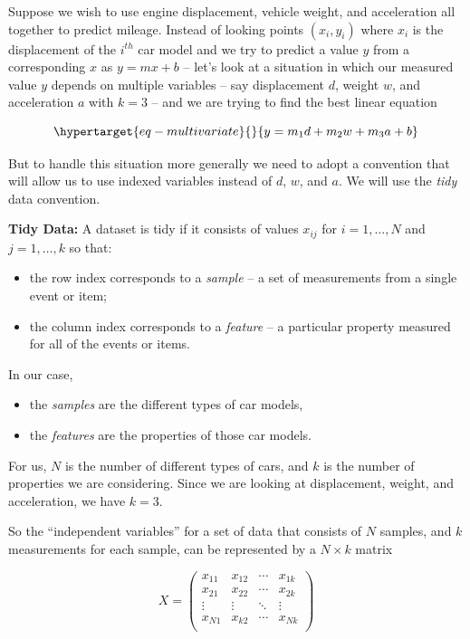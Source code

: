 \documentclass[
  11pt,
  letterpaper,
]{scrbook}
\providecommand{\tightlist}{%
  \setlength{\itemsep}{0pt}\setlength{\parskip}{0pt}}\usepackage{longtable,booktabs,array}
\theoremstyle{plain}
\theoremstyle{plain}
\theoremstyle{remark}
\begin{document}
Suppose we wish to use engine displacement, vehicle weight, and
acceleration all together to predict mileage. Instead of looking points
\((x_i,y_i)\) where \(x_i\) is the displacement of the \(i^{th}\) car
model and we try to predict a value \(y\) from a corresponding \(x\) as
\(y=mx+b\) -- let's look at a situation in which our measured value
\(y\) depends on multiple variables -- say displacement \(d\), weight
\(w\), and acceleration \(a\) with \(k=3\) -- and we are trying to find
the best linear equation

\begin{equation}\protect\hypertarget{eq-multivariate}{}{ 
y=m_1 d + m_2 w + m_3 a +b 
}\label{eq-multivariate}\end{equation}

But to handle this situation more generally we need to adopt a
convention that will allow us to use indexed variables instead of \(d\),
\(w\), and \(a\). We will use the \emph{tidy} data convention.

\textbf{Tidy Data:} A dataset is tidy if it consists of values
\(x_{ij}\) for \(i=1,\ldots,N\) and \(j=1,\ldots, k\) so that:

\begin{itemize}
\tightlist
\item
  the row index corresponds to a \emph{sample} -- a set of measurements
  from a single event or item;
\item
  the column index corresponds to a \emph{feature} -- a particular
  property measured for all of the events or items.
\end{itemize}

In our case,

\begin{itemize}
\tightlist
\item
  the \emph{samples} are the different types of car models,
\item
  the \emph{features} are the properties of those car models.
\end{itemize}

For us, \(N\) is the number of different types of cars, and \(k\) is the
number of properties we are considering. Since we are looking at
displacement, weight, and acceleration, we have \(k=3\).

So the ``independent variables'' for a set of data that consists of
\(N\) samples, and \(k\) measurements for each sample, can be
represented by a \(N\times k\) matrix

\[ X = \left(\begin{matrix} x_{11} & x_{12} & \cdots & x_{1k} \\
x_{21} & x_{22} & \cdots & x_{2k} \\ \vdots & \vdots & \ddots & \vdots
\\ x_{N1} & x_{k2} & \cdots & x_{Nk} \\ \end{matrix}\right)
\]
\end{document}
